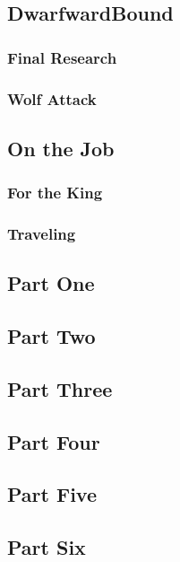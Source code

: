 

\subsection{DwarfwardBound}


\subsubsection{Final Research}


\subsubsection{Wolf Attack}


\subsection{On the Job}


\subsubsection{For the King}


\subsubsection{Traveling}


\subsection{Part One}


\subsection{Part Two}


\subsection{Part Three}


\subsection{Part Four}


\subsection{Part Five}


\subsection{Part Six}

